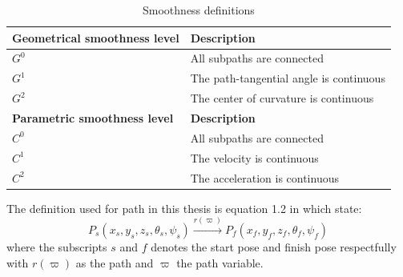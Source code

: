 \begin{table}[H]
\begin{center}
\begin{tabular}{| l | l |}
\hline
\textbf{Geometrical smoothness level} & \textbf{Description} \\ \hline
$G^0$ & All subpaths are connected \\ \hline
$G^1$ & The path-tangential angle is continuous \\ \hline
$G^2$ & The center of curvature is continuous \\ \hline
\textbf{Parametric smoothness level} & \textbf{Description} \\ \hline
$C^0$ & All subpaths are connected \\ \hline
$C^1$ & The velocity is continuous \\ \hline
$C^2$ & The acceleration is continuous \\ \hline
\end{tabular}
\end{center}
\caption{Smoothness definitions}
\label{TB:SmoothnessDescriptions}
\end{table} 

The definition used for path in this thesis is equation 1.2 in \citep{tsourdos2010cooperative} which state:
\begin{equation}
P_s(x_s,y_s,z_s,\theta_s,\psi_s) \xrightarrow{r(\varpi)} P_f(x_f,y_f,z_f,\theta_f,\psi_f)
\end{equation}
where the subscripts $s$ and $f$ denotes the start pose and finish pose respectfully with $r(\varpi)$ as the path and $\varpi$ the path variable.

